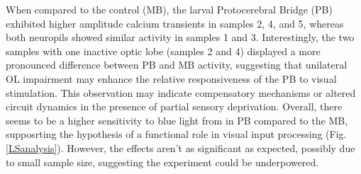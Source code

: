 When compared to the control (MB), the larval Protocerebral Bridge (PB) exhibited higher amplitude calcium transients in samples 2, 4, and 5, whereas both neuropils showed similar activity in samples 1 and 3. Interestingly, the two samples with one inactive optic lobe (samples 2 and 4) displayed a more pronounced difference between PB and MB activity, suggesting that unilateral OL impairment may enhance the relative responsiveness of the PB to visual stimulation. This observation may indicate compensatory mechanisms or altered circuit dynamics in the presence of partial sensory deprivation. 
Overall, there seems to be a higher sensitivity to blue light from in PB compared to the MB, supposrting the hypothesis of a functional role in visual input processing (Fig. \ref{LSanalysis}). However, the effects aren't as significant as expected, possibly due to small sample size, suggesting the experiment could be underpowered.






